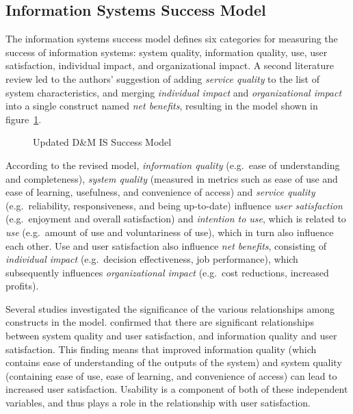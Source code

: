 \subsection{Information Systems Success Model}
\label{sec:is_success}
The information systems success model \citep{DeLone1992,DeLone2004,DeLone2003} defines six categories for measuring the success of information systems: system quality, information quality, use, user satisfaction, individual impact, and organizational impact. A second literature review \citep{DeLone2003} led to the authors' suggestion of adding \textit{service quality} to the list of system characteristics, and merging \textit{individual impact} and \textit{organizational impact} into a single construct named \textit{net benefits}, resulting in the model shown in figure~\ref{img:is_success}.

\begin{figure}[htb]
	\centering
	
	\caption[Updated D\&M IS Success Model]{Updated D\&M IS Success Model \citep{DeLone2003}}
	\label{img:is_success}
\end{figure}

According to the revised model, \textit{information quality} (e.g.\ ease of understanding and completeness), \textit{system quality} (measured in metrics such as ease of use and ease of learning, usefulness, and convenience of access) and \textit{service quality} (e.g.\ reliability, responsiveness, and being up-to-date) influence \textit{user satisfaction} (e.g.\ enjoyment and overall satisfaction) and \textit{intention to use}, which is related to \textit{use} (e.g.\ amount of use and voluntariness of use), which in turn also influence each other. Use and user satisfaction also influence \textit{net benefits}, consisting of \textit{individual impact} (e.g.\ decision effectiveness, job performance), which subsequently influences \textit{organizational impact} (e.g.\ cost reductions, increased profits).

Several studies investigated the significance of the various relationships among constructs in the model.  confirmed that there are significant relationships between system quality and user satisfaction, and information quality and user satisfaction. This finding means that improved information quality (which contains ease of understanding of the outputs of the system) and system quality (containing ease of use, ease of learning, and convenience of access) can lead to increased user satisfaction. Usability is a component of both of these independent variables, and thus plays a role in the relationship with user satisfaction.

